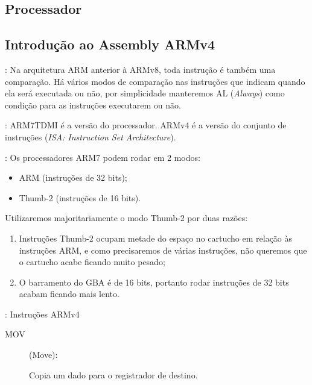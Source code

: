 \documentclass{beamer}
\let\emph\relax %
\begin{document}
\begin{darkframes}
\section{Processador}
\subsection{Introdução ao Assembly ARMv4}

\begin{frame}{\secname: \subsecname}
    Na arquitetura ARM anterior à ARMv8, toda instrução é também uma
    comparação. Há vários modos de comparação nas instruções que indicam
    quando ela será executada ou não, por simplicidade manteremos AL
    (\textit{Always}) como condição para as instruções executarem ou não.


    \emph{OBS}: ARM7TDMI é a versão do processador. ARMv4 é a versão do
    conjunto de instruções (\textit{ISA: Instruction Set Architecture}).
\end{frame}

\begin{frame}{\secname: \subsecname}
    Os processadores ARM7 podem rodar em 2 modos:
    \begin{itemize}
        \item ARM (instruções de 32 bits);
        \item Thumb-2 (instruções de 16 bits).
    \end{itemize}


    Utilizaremos majoritariamente o modo Thumb-2 por duas razões:
    \begin{enumerate}
        \item Instruções Thumb-2 ocupam metade do espaço no cartucho em
            relação às instruções ARM, e como precisaremos de várias
            instruções, não queremos que o cartucho acabe ficando muito
            pesado;
        \item O barramento do GBA é de 16 bits, portanto rodar instruções
            de 32 bits acabam ficando mais lento.
    \end{enumerate}
\end{frame}

\begin{frame}[fragile]{\secname: Instruções ARMv4}
    \begin{description}
        \item[MOV] (Move):

            Copia um dado para o registrador de destino.


\end{description}
\end{frame}
\end{darkframes}
\end{document}
